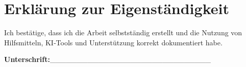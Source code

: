 \section{Erklärung zur Eigenständigkeit}
Ich bestätige, dass ich die Arbeit selbstständig erstellt und die Nutzung von Hilfsmitteln,
KI‑Tools und Unterstützung korrekt dokumentiert habe. 
\newline
\newline
\newline
\newline
\newline

\textbf{Unterschrift:}\_\_\_\_\_\_\_\_\_\_\_\_\_\_\_\_\_\_\_\_\_\_\_\_\_\_\_\_\_\_

